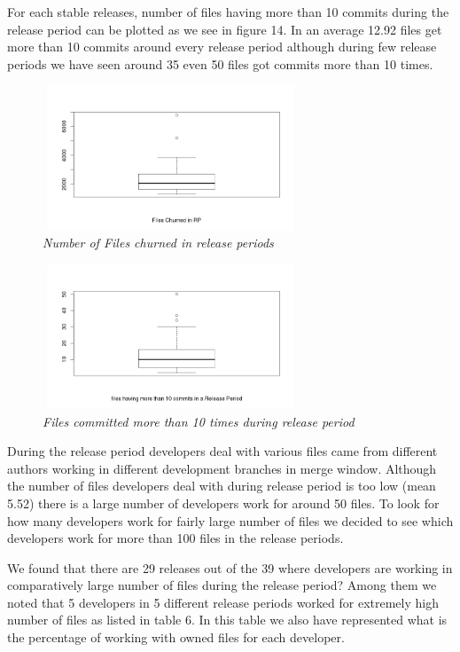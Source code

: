 \documentclass{acm_proc_article-sp}
\begin{document}
For each stable releases, number of files having more than 10 commits during the release period can be plotted as we see in figure 14. In an average 12.92 files get more than 10 commits around every release period although during few release periods we have seen around 35 even 50 files got commits more than 10 times.

\begin{figure}
\begin{center}
\includegraphics[height=1.7in,width=3in]{fileChurnRPbox.png}
\caption{\small \sl Number of Files churned in release periods}
\end{center}
\end{figure}

\begin{figure}
\begin{center}
\includegraphics[height=1.7in,width=3in]{file_commit_exeptional_rp10box.png}
\caption{\small \sl Files committed more than 10 times during release period}
\end{center}
\end{figure}

During the release period developers deal with various files came from different authors working in different development branches in merge window. Although the number of files developers deal with during release period is too low (mean 5.52) there is a large number of developers work for around 50 files. To look for how many developers work for fairly large number of files we decided to see which developers work for more than 100 files in the release periods.

We found that there are 29 releases out of the 39 where developers are working in comparatively large number of files during the release period? Among them we noted that 5 developers in 5 different release periods worked for extremely high number of files as listed in table 6. In this table we also have represented what is the percentage of working with owned files for each developer.
\end{document}

